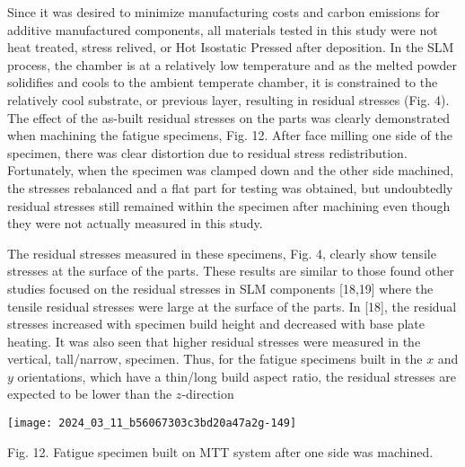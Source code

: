 \documentclass[10pt]{article}
\begin{document}
Since it was desired to minimize manufacturing costs and carbon emissions for additive manufactured components, all materials tested in this study were not heat treated, stress relived, or Hot Isostatic Pressed after deposition. In the SLM process, the chamber is at a relatively low temperature and as the melted powder solidifies and cools to the ambient temperate chamber, it is constrained to the relatively cool substrate, or previous layer, resulting in residual stresses (Fig. 4). The effect of the as-built residual stresses on the parts was clearly demonstrated when machining the fatigue specimens, Fig. 12. After face milling one side of the specimen, there was clear distortion due to residual stress redistribution. Fortunately, when the specimen was clamped down and the other side machined, the stresses rebalanced and a flat part for testing was obtained, but undoubtedly residual stresses still remained within the specimen after machining even though they were not actually measured in this study.

The residual stresses measured in these specimens, Fig. 4, clearly show tensile stresses at the surface of the parts. These results are similar to those found other studies focused on the residual stresses in SLM components [18,19] where the tensile residual stresses were large at the surface of the parts. In [18], the residual stresses increased with specimen build height and decreased with base plate heating. It was also seen that higher residual stresses were measured in the vertical, tall/narrow, specimen. Thus, for the fatigue specimens built in the $x$ and $y$ orientations, which have a thin/long build aspect ratio, the residual stresses are expected to be lower than the $z$-direction

\begin{center}
\texttt{[image: 2024\_03\_11\_b56067303c3bd20a47a2g-149]}
\end{center}

Fig. 12. Fatigue specimen built on MTT system after one side was machined.
\end{document}
